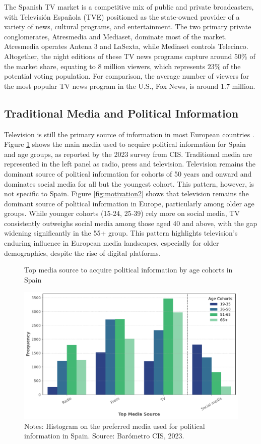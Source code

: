 \documentclass[12pt]{article}
\begin{document}
	
	The Spanish TV market is a competitive mix of public and private broadcasters, with Televisión Española (TVE) positioned as the state-owned provider of a variety of news, cultural programs, and entertainment. The two primary private conglomerates, Atresmedia and Mediaset, dominate most of the market. Atresmedia operates Antena 3 and LaSexta, while Mediaset controls Telecinco. Altogether, the night editions of these TV news programs capture around $50\%$ of the market share, equating to 8 million viewers, which represents $23\%$ of the potential voting population. For comparison, the average number of viewers for the most popular TV news program in the U.S., Fox News, is around 1.7 million. 
	
	\subsection*{Traditional Media and Political Information}
	
	
	Television is still the primary source of information in most European countries \citep{europarl2024}. Figure \ref{fig:motivation} shows the main media used to acquire political information for Spain and age groups, as reported by the 2023 survey from CIS. Traditional media are represented in the left panel as radio, press and television. Television remains the dominant source of political information for cohorts of 50 years and onward and dominates social media for all but the youngest cohort. This pattern, however, is not specific to Spain. Figure \ref{fig:motivation2} shows that television remains the dominant source of political information in Europe, particularly among older age groups. While younger cohorts (15-24, 25-39) rely more on social media, TV consistently outweighs social media among those aged 40 and above, with the gap widening significantly in the 55+ group. This pattern highlights television’s enduring influence in European media landscapes, especially for older demographics, despite the rise of digital platforms.
	
	

	\begin{figure}[h!]
		\centering
		\caption{Top media source to acquire political information by age cohorts in Spain}
		\includegraphics[width=120mm]{figures/age_cohorts}
\caption*{\small Notes: Histogram on the preferred media used for political information in Spain.  
	Source: Barómetro CIS, 2023. }
\label{fig:motivation}
	\end{figure}
	
\end{document}
